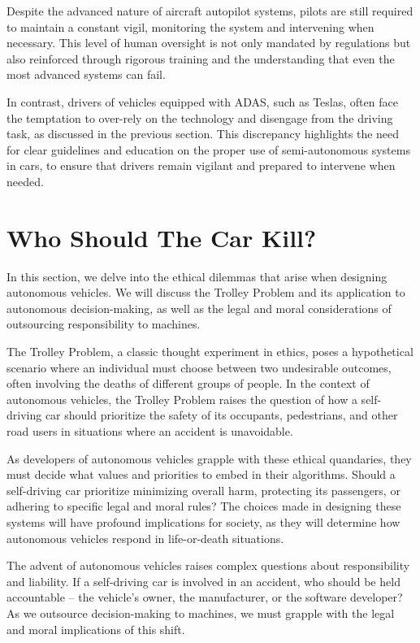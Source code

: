 Despite the advanced nature of aircraft autopilot systems, pilots are still required to maintain a constant vigil, monitoring the system and intervening when necessary. This level of human oversight is not only mandated by regulations but also reinforced through rigorous training and the understanding that even the most advanced systems can fail.

In contrast, drivers of vehicles equipped with ADAS, such as Teslas, often face the temptation to over-rely on the technology and disengage from the driving task, as discussed in the previous section. This discrepancy highlights the need for clear guidelines and education on the proper use of semi-autonomous systems in cars, to ensure that drivers remain vigilant and prepared to intervene when needed.

\section{Who Should The Car Kill?}

In this section, we delve into the ethical dilemmas that arise when designing autonomous vehicles. We will discuss the Trolley Problem and its application to autonomous decision-making, as well as the legal and moral considerations of outsourcing responsibility to machines.

The Trolley Problem, a classic thought experiment in ethics, poses a hypothetical scenario where an individual must choose between two undesirable outcomes, often involving the deaths of different groups of people. In the context of autonomous vehicles, the Trolley Problem raises the question of how a self-driving car should prioritize the safety of its occupants, pedestrians, and other road users in situations where an accident is unavoidable.

As developers of autonomous vehicles grapple with these ethical quandaries, they must decide what values and priorities to embed in their algorithms. Should a self-driving car prioritize minimizing overall harm, protecting its passengers, or adhering to specific legal and moral rules? The choices made in designing these systems will have profound implications for society, as they will determine how autonomous vehicles respond in life-or-death situations.

The advent of autonomous vehicles raises complex questions about responsibility and liability. If a self-driving car is involved in an accident, who should be held accountable – the vehicle's owner, the manufacturer, or the software developer? As we outsource decision-making to machines, we must grapple with the legal and moral implications of this shift.

